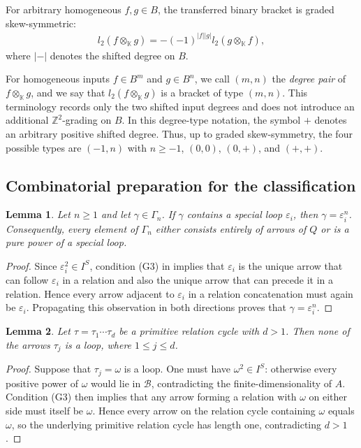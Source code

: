 \documentclass[11pt,a4paper,reqno]{amsart}
\newcommand{\mK}{\mathbb K}
\newcommand{\mB}{\mathcal B}
\newcommand{\ep}{\varepsilon}
\theoremstyle{plain}
\newtheorem{lemma}[lemma]{Lemma}
\theoremstyle{definition}
\numberwithin{equation}{section}
\begin{document}
	For arbitrary homogeneous $f,g\in B$, the transferred binary bracket is
	graded skew-symmetric:
	\begin{align}\label{sym}
		l_2(f\otimes_{\mK} g)
		=
		-(-1)^{|f||g|}l_2(g\otimes_{\mK} f),
	\end{align}
	where $|-|$ denotes the shifted degree on $B$.
	
	For homogeneous inputs $f\in B^m$ and $g\in B^n$, we call $(m,n)$ the
	\emph{degree pair} of $f\otimes_{\mK}g$, and we say that
	$l_2(f\otimes_{\mK}g)$ is a bracket of type $(m,n)$.  This terminology
	records only the two shifted input degrees and does not introduce an additional
	$\mathbb Z^2$-grading on $B$.  In this degree-type notation, the symbol $+$
	denotes an arbitrary positive shifted degree.  Thus, up to graded
	skew-symmetry, the four possible types are $(-1,n)$ with
	$n\geq-1$, $(0,0)$, $(0,+)$, and $(+,+)$.
	
	\subsection{Combinatorial preparation for the classification}
	\label{subsec:path-replacement-notation}
	
	\begin{lemma}\label{lem:special-loop-dichotomy}
		Let $n\geq1$ and let $\gamma\in\Gamma_n$. If $\gamma$ contains a special loop $\ep_i$, then $\gamma=\ep_i^n$. Consequently, every element of $\Gamma_n$ either consists entirely of arrows of $Q$ or is a pure power of a special loop.
	\end{lemma}
	
	\begin{proof}
		Since $\ep_i^2\in I^S$, condition \textup{(G3)} in
		 implies that $\ep_i$ is the unique arrow that
		can follow $\ep_i$ in a relation and also the unique arrow that can precede
		it in a relation. Hence every arrow adjacent to $\ep_i$ in a relation
		concatenation must again be $\ep_i$. Propagating this observation in both
		directions proves that $\gamma=\ep_i^n$.
	\end{proof}
	
	\begin{lemma}
		\label{cycle-not-has-loop}
		Let $\tau=\tau_1\cdots\tau_d$ be a primitive relation cycle with $d>1$. Then none of the arrows $\tau_j$ is a loop, where $1\leq j\leq d$.
	\end{lemma}
	
	\begin{proof}
		Suppose that $\tau_j=\omega$ is a loop. One must have $\omega^2\in I^S$:
		otherwise every positive power of $\omega$ would lie in $\mB$, contradicting
		the finite-dimensionality of $A$. Condition \textup{(G3)} then implies that
		any arrow forming a relation with $\omega$ on either side must itself be
		$\omega$. Hence every arrow on the relation cycle containing $\omega$ equals
		$\omega$, so the underlying primitive relation cycle has length one,
		contradicting $d>1$.
	\end{proof}
	
\end{document}
